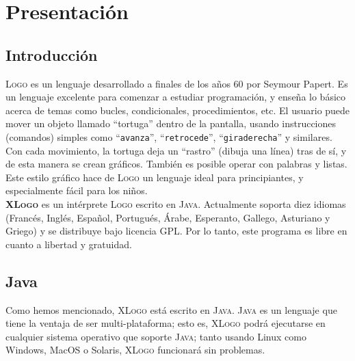\chapter{Presentaci\'on}
   \label{Presentacion}

\section{Introducci\'on}
   \label{Introduccion}

\textsc{Logo} es un lenguaje desarrollado a finales de los a\~nos 60 por
Seymour Papert. Es un lenguaje excelente para comenzar a estudiar
programaci\'on, y ense\~na lo b\'asico acerca de temas como bucles,
condicionales, procedimientos, etc. El usuario puede mover un objeto llamado 
``tortuga'' dentro de la pantalla, usando instrucciones (comandos) simples
como ``\texttt{avanza}'', ``\texttt{retrocede}'', ``\texttt{giraderecha}''
y similares. Con cada movimiento, la tortuga deja un ``rastro'' (dibuja
una l\'inea) tras de s\'i, y de esta manera se crean gr\'aficos. Tambi\'en
es posible operar con palabras y listas.\\

Este estilo gr\'afico hace de \textsc{Logo} un lenguaje ideal para
principiantes, y especialmente f\'acil para los ni\~nos. \\

\textsc{\textbf{XLogo}} es un int\'erprete \textsc{Logo} escrito en
\textsc{Java}. Actualmente soporta diez idiomas (Franc\'es, Ingl\'es,
Espa\~nol, Portugu\'es, \'Arabe, Esperanto, Gallego, Asturiano y Griego) y se
distribuye bajo licencia GPL. Por lo tanto, este programa es libre en cuanto
a libertad y gratuidad.

\section{Java}
   \label{Java}

Como hemos mencionado, \textsc{XLogo} est\'a escrito en \textsc{Java}.
\textsc{Java} es un lenguaje que tiene la ventaja de ser multi-plataforma; esto
es, \textsc{XLogo} podr\'a ejecutarse en cualquier sistema operativo que soporte
\textsc{Java}; tanto usando Linux como Windows, MacOS o Solaris, \textsc{XLogo}
funcionar\'a sin problemas.